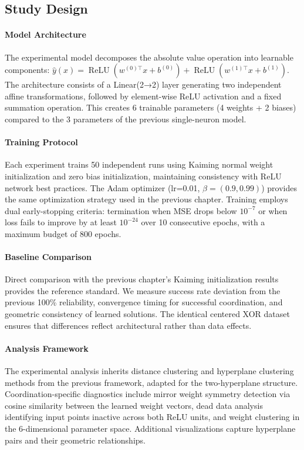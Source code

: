 
\subsection*{Study Design}

\paragraph{Model Architecture}
The experimental model decomposes the absolute value operation into learnable components: $\hat{y}(x) = \operatorname{ReLU}(w^{(0)\top}x + b^{(0)}) + \operatorname{ReLU}(w^{(1)\top}x + b^{(1)})$. The architecture consists of a Linear(2→2) layer generating two independent affine transformations, followed by element-wise ReLU activation and a fixed summation operation. This creates 6 trainable parameters (4 weights + 2 biases) compared to the 3 parameters of the previous single-neuron model.

\paragraph{Training Protocol}
Each experiment trains 50 independent runs using Kaiming normal weight initialization and zero bias initialization, maintaining consistency with ReLU network best practices. The Adam optimizer (lr=0.01, $\beta = (0.9, 0.99)$) provides the same optimization strategy used in the previous chapter. Training employs dual early-stopping criteria: termination when MSE drops below $10^{-7}$ or when loss fails to improve by at least $10^{-24}$ over 10 consecutive epochs, with a maximum budget of 800 epochs.

\paragraph{Baseline Comparison}
Direct comparison with the previous chapter's Kaiming initialization results provides the reference standard. We measure success rate deviation from the previous 100\% reliability, convergence timing for successful coordination, and geometric consistency of learned solutions. The identical centered XOR dataset ensures that differences reflect architectural rather than data effects.

\paragraph{Analysis Framework}
The experimental analysis inherits distance clustering and hyperplane clustering methods from the previous framework, adapted for the two-hyperplane structure. Coordination-specific diagnostics include mirror weight symmetry detection via cosine similarity between the learned weight vectors, dead data analysis identifying input points inactive across both ReLU units, and weight clustering in the 6-dimensional parameter space. Additional visualizations capture hyperplane pairs and their geometric relationships.

